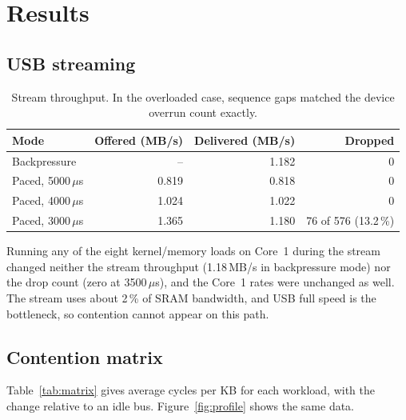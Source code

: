\documentclass[11pt,a4paper]{article}
\begin{document}
\section{Results}
\subsection{USB streaming}
\begin{table}[h]
\centering
\begin{tabular}{@{}lrrr@{}}
\toprule
Mode & Offered (MB/s) & Delivered (MB/s) & Dropped \\
\midrule
Backpressure & -- & 1.182 & 0 \\
Paced, 5000\,$\mu$s & 0.819 & 0.818 & 0 \\
Paced, 4000\,$\mu$s & 1.024 & 1.022 & 0 \\
Paced, 3000\,$\mu$s & 1.365 & 1.180 & 76 of 576 (13.2\,\%) \\
\bottomrule
\end{tabular}
\caption{Stream throughput. In the overloaded case, sequence gaps matched the device overrun count exactly.}
\end{table}

\noindent Running any of the eight kernel/memory loads on Core~1 during the stream changed neither
the stream throughput (1.18\,MB/s in backpressure mode) nor the drop count (zero at 3500\,$\mu$s),
and the Core~1 rates were unchanged as well. The stream uses about 2\,\% of SRAM bandwidth, and USB
full speed is the bottleneck, so contention cannot appear on this path.

\subsection{Contention matrix}
Table~\ref{tab:matrix} gives average cycles per KB for each workload, with the change relative to
an idle bus. Figure~\ref{fig:profile} shows the same data.
\end{document}
